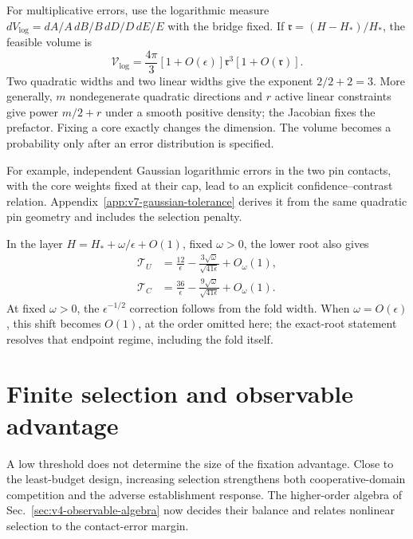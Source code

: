 \documentclass[aps,pre,reprint,amsmath,amssymb,longbibliography]{revtex4-2}
\begin{document}
For multiplicative errors, use the logarithmic measure
$dV_{\log}=dA/A\,dB/B\,dD/D\,dE/E$ with the bridge fixed. If
$\mathfrak r=(H-H_*)/H_*$, the feasible volume is
\begin{equation}
 \mathcal V_{\log}=\frac{4\pi}{3}[1+O(\epsilon)]
             \mathfrak r^3[1+O(\mathfrak r)].
 \label{eq:v3-main-volume}
\end{equation}
Two quadratic widths and two linear widths give the exponent
$2/2+2=3$. More generally, $m$ nondegenerate quadratic directions
and $r$ active linear constraints give power $m/2+r$ under a smooth
positive density; the Jacobian fixes the prefactor. Fixing a core
exactly changes the dimension. The volume becomes a probability only
after an error distribution is specified.


For example, independent Gaussian logarithmic errors in the two pin
contacts, with the core weights fixed at their cap, lead to an
explicit confidence--contrast relation. Appendix~\ref{app:v7-gaussian-tolerance}
derives it from the same quadratic pin geometry and includes the
selection penalty.


In the layer $H=H_*+\omega/\epsilon+O(1)$, fixed $\omega>0$,
the lower root also gives
\begin{equation}
 \begin{aligned}
 \mathcal T_U&=\frac{12}{\epsilon}
        -\frac{3\sqrt\omega}{\sqrt{41\epsilon}}+O_\omega(1),\\
 \mathcal T_C&=\frac{36}{\epsilon}
        -\frac{9\sqrt\omega}{\sqrt{41\epsilon}}+O_\omega(1).
 \end{aligned}
 \label{eq:finite-budget-time-layer-v2}
\end{equation}
At fixed $\omega>0$, the $\epsilon^{-1/2}$ correction follows from the
fold width. When $\omega=O(\epsilon)$, this shift becomes $O(1)$,
at the order omitted here; the exact-root statement resolves that
endpoint regime, including the fold itself.

\section{Finite selection and observable advantage}
\label{sec:v3-selection-window}
A low threshold does not determine the size of the fixation advantage.
Close to the least-budget design, increasing selection strengthens
both cooperative-domain competition and the adverse establishment
response. The higher-order algebra of Sec.~\ref{sec:v4-observable-algebra}
now decides their balance and relates nonlinear selection to the
contact-error margin.
\end{document}
